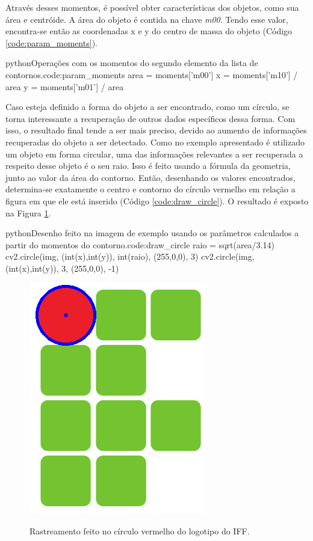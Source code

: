 Através desses momentos, é possível obter características dos objetos, como sua área e centróide. A área do objeto é contida na chave \textit{m00}. Tendo esse valor, encontra-se então as coordenadas x e y do centro de massa do objeto (Código \ref{code:param_moments}).

\begin{code}{python}{Operações com os momentos do segundo elemento da lista de contornos.}{code:param_moments}
area = moments['m00']
x = moments['m10'] / area
y = moments['m01'] / area
\end{code}

Caso esteja definido a forma do objeto a ser encontrado, como um círculo, se torna interessante a recuperação de outros dados específicos dessa forma. Com isso, o resultado final tende a ser mais preciso, devido ao aumento de informações recuperadas do objeto a ser detectado. Como no exemplo apresentado é utilizado um objeto em forma circular, uma das informações relevantes a ser recuperada a respeito desse objeto é o seu raio. Isso é feito usando a fórmula da geometria, junto ao valor da área do contorno. Então, desenhando os valores encontrados, determina-se exatamente o centro e contorno do círculo vermelho em relação a figura em que ele está inserido (Código \ref{code:draw_circle}). O resultado é exposto na Figura \ref{img:track_final}.

\begin{code}{python}{Desenho feito na imagem de exemplo usando os parâmetros calculados a partir do momentos do contorno.}{code:draw_circle}
raio = sqrt(area/3.14)
cv2.circle(img, (int(x),int(y)), int(raio), (255,0,0), 3)
cv2.circle(img, (int(x),int(y)), 3, (255,0,0), -1)
\end{code}

\begin{figure}[H]
    \centering
    {\includegraphics[scale=0.25]{figuras/track_final}}
    \caption{Rastreamento feito no círculo vermelho do logotipo do IFF.}
    \label{img:track_final}
\end{figure}


